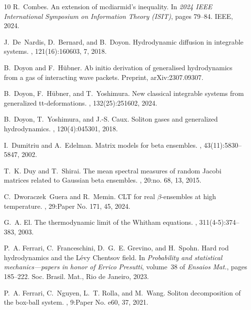 \documentclass{amsart}
\numberwithin{equation}{section}
\theoremstyle{remark}
\theoremstyle{definition}
\begin{document}
\begin{thebibliography}{10}
		R.~Combes.
		\newblock An extension of mcdiarmid's inequality.
		\newblock In {\em 2024 IEEE International Symposium on Information Theory
			(ISIT)}, pages 79--84. IEEE, 2024.
		
		J.~De~Nardis, D.~Bernard, and B.~Doyon.
		\newblock Hydrodynamic diffusion in integrable systems.
		, 121(16):160603, 7, 2018.
		
		B.~Doyon and F.~H\"{u}bner.
		\newblock Ab initio derivation of generalised hydrodynamics from a gas of
		interacting wave packets.
		\newblock Preprint, ar{X}iv:2307.09307.
		
		B.~Doyon, F.~H{\"u}bner, and T.~Yoshimura.
		\newblock New classical integrable systems from generalized tt-deformations.
		, 132(25):251602, 2024.
		
		B.~Doyon, T.~Yoshimura, and J.-S. Caux.
		\newblock Soliton gases and generalized hydrodynamics.
		, 120(4):045301, 2018.
		
		I.~Dumitriu and A.~Edelman.
		\newblock Matrix models for beta ensembles.
		, 43(11):5830--5847, 2002.
		
		T.~K. Duy and T.~Shirai.
		\newblock The mean spectral measures of random {J}acobi matrices related to
		{G}aussian beta ensembles.
		, 20:no. 68, 13, 2015.
		
		C.~Dworaczek~Guera and R.~Memin.
		\newblock C{LT} for real {$\beta $}-ensembles at high temperature.
		, 29:Paper No. 171, 45, 2024.
		
		G.~A. El.
		\newblock The thermodynamic limit of the {W}hitham equations.
		, 311(4-5):374--383, 2003.
		
		P.~A. Ferrari, C.~Franceschini, D.~G.~E. Grevino, and H.~Spohn.
		\newblock Hard rod hydrodynamics and the {L}\'evy {C}hentsov field.
		\newblock In {\em Probability and statistical mechanics---papers in honor of
			{E}rrico {P}resutti}, volume~38 of {\em Ensaios Mat.}, pages 185--222. Soc.
		Brasil. Mat., Rio de Janeiro, 2023.
		
		P.~A. Ferrari, C.~Nguyen, L.~T. Rolla, and M.~Wang.
		\newblock Soliton decomposition of the box-ball system.
		, 9:Paper No. e60, 37, 2021.
		

\end{thebibliography}
\end{document}

